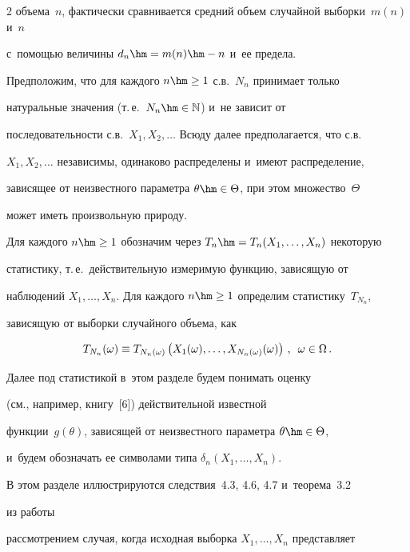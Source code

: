 \begin{multicols}{2}
объема~$n$, фактически сравнивается средний объем случайной выборки~$m(n)$ и~$n$ 


с~помощью величины $d_n\hm = m(n)\hm - n$ и~ее предела.





Предположим, что для каждого $n\hm\geq1$ с.в.~$N_n$ принимает только 


натуральные значения (т.\,е.\ $N_n \hm\in \mathbb{N}$) и~не зависит от 


последовательности с.в.\ $X_1, X_2, \ldots$ Всюду далее предполагается, что с.в.\


$X_1, X_2, \ldots$ независимы, одинаково распределены и~имеют распределение, 


зависящее от неизвестного параметра $\theta\hm \in \Theta$, при этом множество~$\Theta$ 


может иметь произвольную природу.





Для каждого $n\hm\geq1$ обозначим через $T_n\hm=T_n(X_1,\ldots,X_n)$ некоторую 


статистику, т.\,е.\ действительную измеримую функцию, зависящую от 


наблюдений $X_1,\ldots,X_n$. Для каждого $n\hm\geq1$ определим статистику~$T_{N_n}$, 


зависящую от выборки случайного объема, как


$$


T_{N_n}(\omega) \equiv T_{N_n(\omega)}\left(X_1(\omega),\ldots,X_{N_n(\omega)}(\omega)\right)\,,\enskip


\omega \in \Omega\,.


$$


Далее под статистикой в~этом разделе будем понимать оценку 


(см., например, книгу~[6]) действительной известной 


функции~$g(\theta)$, зависящей от неизвестного параметра $\theta\hm \in \Theta$, 


и~будем обозначать ее символами типа $\delta_n(X_1,\ldots,X_n)$.





В этом разделе иллюстрируются следствия~4.3, 4.6, 4.7 и~теорема~3.2 


из работы~\cite{2-ben}


рассмотрением случая, когда исходная выборка $X_1,\ldots,X_n$ представляет 



\end{multicols}
